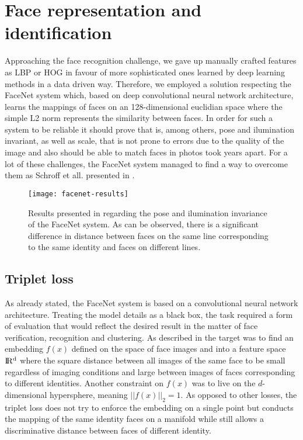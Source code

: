 \section{Face representation and identification}
Approaching the face recognition challenge, we gave up manually crafted features as LBP or HOG in favour of more sophisticated ones learned by deep learning methods in a data driven way. Therefore, we employed a solution respecting the FaceNet system which, based on  deep convolutional neural network architecture, learns the mappings of faces on an 128-dimensional euclidian space where the simple L2 norm represents the similarity between faces. In order for such a system to be reliable it should prove that is, among others, pose and ilumination invariant, as well as scale, that is not prone to errors due to the quality of the image and also should be able to match faces in photos took years apart. For a lot of these challenges, the FaceNet system managed to find a way to overcome them as Schroff et all. presented in \cite{SchroffKP15}.
\begin{figure}[h]
	\begin{center}
		\texttt{[image: facenet-results]}
	\end{center}
	\caption[FaceNet pose and ilumination invariance from \cite{SchroffKP15}]{Results presented in \cite{SchroffKP15} regarding the pose and ilumination invariance of the FaceNet system. As can be observed, there is a significant difference in distance between faces on the same line corresponding to the same identity and faces on different lines.}
\end{figure}
\subsection{Triplet loss}
As already stated, the FaceNet system is based on a convolutional neural network architecture. Treating the model details as a black box, the task required a form of evaluation that would reflect the desired result in the matter of face verification, recognition and clustering. As described in \cite{SchroffKP15} the target was to find an embedding $f(x)$ defined on the space of face images and into a feature space $\rm I\!R^{d}$ where the square distance between all images of the same face to be small regardless of imaging conditions and large between images of faces corresponding to different identities. Another constraint on $f(x)$ was to live on the $d$-dimensional hypersphere, meaning $||f(x)||_{2}=1$. As opposed to other losses, the triplet loss does not try to enforce the embedding on a single point but conducts the mapping of the same identity faces on a manifold while still allows a discriminative distance between faces of different identity. 


